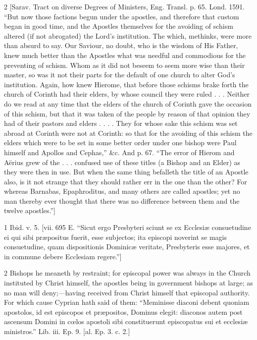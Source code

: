 2
[Sarav. Tract on diverse Degrees of Ministers, Eng. Transl. p. 65. Lond. 1591. “But now those factions begun under the apostles, and therefore that custom began in good time, and the Apostles themselves for the avoiding of schism altered (if not abrogated) the Lord’s institution. The which, methinks, were more than absurd to say. Our Saviour, no doubt, who is the wisdom of His Father, knew much better than the Apostles what was needful and commodious for the preventing of schism. Whom as it did not beseem to seem more wise than their master, so was it not their parts for the default of one church to alter God’s institution. Again, how knew Hierome, that before those schisms brake forth the church of Corinth had their elders, by whose council they were ruled . . . Neither do we read at any time that the elders of the church of Corinth gave the occasion of this schism, but that it was taken of the people by reason of that opinion they had of their pastors and elders . . . . They for whose sake this schism was set abroad at Corinth were not at Corinth: so that for the avoiding of this schism the elders which were to be set in some better order under one bishop were Paul himself and Apollos and Cephas,” &c. And p. 67. “The error of Hierom and Aërius grew of the . . . confused use of these titles (a Bishop and an Elder) as they were then in use. But when the same thing befalleth the title of an Apostle also, is it not strange that they should rather err in the one than the other? For whereas Barnabas, Epaphroditus, and many others are called apostles; yet no man thereby ever thought that there was no difference between them and the twelve apostles.”]

1
Ibid. v. 5. [vii. 695 E. “Sicut ergo Presbyteri sciunt se ex Ecclesiæ consuetudine ei qui sibi præpositus fuerit, esse subjectos; ita episcopi noverint se magis consuetudine, quam dispositionis Dominicæ veritate, Presbyteris esse majores, et in commune debere Ecclesiam regere.”]

2
Bishops he meaneth by restraint; for episcopal power was always in the Church instituted by Christ himself, the apostles being in government bishops at large; as no man will deny;—having received from Christ himself that episcopal authority. For which cause Cyprian hath said of them: “Meminisse diaconi debent quoniam apostolos, id est episcopos et præpositos, Dominus elegit: diaconos autem post ascensum Domini in cœlos apostoli sibi constituerunt episcopatus sui et ecclesiæ ministros.” Lib. iii. Ep. 9. [al. Ep. 3. c. 2.]

